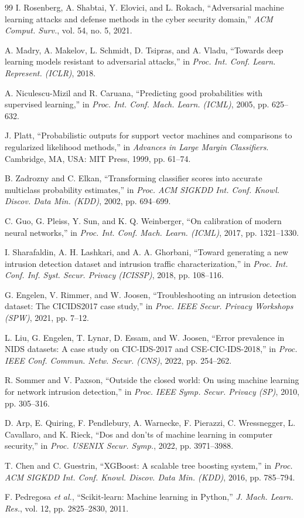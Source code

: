\documentclass[conference]{IEEEtran}
\begin{document}
\begin{thebibliography}{99}
I. Rosenberg, A. Shabtai, Y. Elovici, and L. Rokach, ``Adversarial machine learning attacks and defense methods in the cyber security domain,'' \emph{ACM Comput. Surv.}, vol. 54, no. 5, 2021.

A. Madry, A. Makelov, L. Schmidt, D. Tsipras, and A. Vladu, ``Towards deep learning models resistant to adversarial attacks,'' in \emph{Proc. Int. Conf. Learn. Represent. (ICLR)}, 2018.

A. Niculescu-Mizil and R. Caruana, ``Predicting good probabilities with supervised learning,'' in \emph{Proc. Int. Conf. Mach. Learn. (ICML)}, 2005, pp. 625--632.

J. Platt, ``Probabilistic outputs for support vector machines and comparisons to regularized likelihood methods,'' in \emph{Advances in Large Margin Classifiers}. Cambridge, MA, USA: MIT Press, 1999, pp. 61--74.

B. Zadrozny and C. Elkan, ``Transforming classifier scores into accurate multiclass probability estimates,'' in \emph{Proc. ACM SIGKDD Int. Conf. Knowl. Discov. Data Min. (KDD)}, 2002, pp. 694--699.

C. Guo, G. Pleiss, Y. Sun, and K. Q. Weinberger, ``On calibration of modern neural networks,'' in \emph{Proc. Int. Conf. Mach. Learn. (ICML)}, 2017, pp. 1321--1330.

I. Sharafaldin, A. H. Lashkari, and A. A. Ghorbani, ``Toward generating a new intrusion detection dataset and intrusion traffic characterization,'' in \emph{Proc. Int. Conf. Inf. Syst. Secur. Privacy (ICISSP)}, 2018, pp. 108--116.

G. Engelen, V. Rimmer, and W. Joosen, ``Troubleshooting an intrusion detection dataset: The CICIDS2017 case study,'' in \emph{Proc. IEEE Secur. Privacy Workshops (SPW)}, 2021, pp. 7--12.

L. Liu, G. Engelen, T. Lynar, D. Essam, and W. Joosen, ``Error prevalence in NIDS datasets: A case study on CIC-IDS-2017 and CSE-CIC-IDS-2018,'' in \emph{Proc. IEEE Conf. Commun. Netw. Secur. (CNS)}, 2022, pp. 254--262.

R. Sommer and V. Paxson, ``Outside the closed world: On using machine learning for network intrusion detection,'' in \emph{Proc. IEEE Symp. Secur. Privacy (SP)}, 2010, pp. 305--316.

D. Arp, E. Quiring, F. Pendlebury, A. Warnecke, F. Pierazzi, C. Wressnegger, L. Cavallaro, and K. Rieck, ``Dos and don'ts of machine learning in computer security,'' in \emph{Proc. USENIX Secur. Symp.}, 2022, pp. 3971--3988.

T. Chen and C. Guestrin, ``XGBoost: A scalable tree boosting system,'' in \emph{Proc. ACM SIGKDD Int. Conf. Knowl. Discov. Data Min. (KDD)}, 2016, pp. 785--794.

F. Pedregosa \emph{et al.}, ``Scikit-learn: Machine learning in Python,'' \emph{J. Mach. Learn. Res.}, vol. 12, pp. 2825--2830, 2011.

\end{thebibliography}
\end{document}

